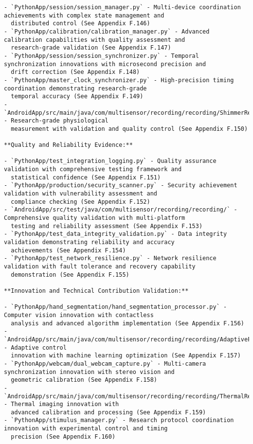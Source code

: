 \documentclass[11pt,a4paper]{report}
\begin{document}
\begin{verbatim}
- `PythonApp/session/session_manager.py` - Multi-device coordination achievements with complex state management and
  distributed control (See Appendix F.146)
- `PythonApp/calibration/calibration_manager.py` - Advanced calibration capabilities with quality assessment and
  research-grade validation (See Appendix F.147)
- `PythonApp/session/session_synchronizer.py` - Temporal synchronization innovations with microsecond precision and
  drift correction (See Appendix F.148)
- `PythonApp/master_clock_synchronizer.py` - High-precision timing coordination demonstrating research-grade
  temporal accuracy (See Appendix F.149)
- `AndroidApp/src/main/java/com/multisensor/recording/recording/ShimmerRecorder.kt` - Research-grade physiological
  measurement with validation and quality control (See Appendix F.150)

**Quality and Reliability Evidence:**

- `PythonApp/test_integration_logging.py` - Quality assurance validation with comprehensive testing framework and
  statistical confidence (See Appendix F.151)
- `PythonApp/production/security_scanner.py` - Security achievement validation with vulnerability assessment and
  compliance checking (See Appendix F.152)
- `AndroidApp/src/test/java/com/multisensor/recording/recording/` - Comprehensive quality validation with multi-platform
  testing and reliability assessment (See Appendix F.153)
- `PythonApp/test_data_integrity_validation.py` - Data integrity validation demonstrating reliability and accuracy
  achievements (See Appendix F.154)
- `PythonApp/test_network_resilience.py` - Network resilience validation with fault tolerance and recovery capability
  demonstration (See Appendix F.155)

**Innovation and Technical Contribution Validation:**

- `PythonApp/hand_segmentation/hand_segmentation_processor.py` - Computer vision innovation with contactless
  analysis and advanced algorithm implementation (See Appendix F.156)
- `AndroidApp/src/main/java/com/multisensor/recording/recording/AdaptiveFrameRateController.kt` - Adaptive control
  innovation with machine learning optimization (See Appendix F.157)
- `PythonApp/webcam/dual_webcam_capture.py` - Multi-camera synchronization innovation with stereo vision and
  geometric calibration (See Appendix F.158)
- `AndroidApp/src/main/java/com/multisensor/recording/recording/ThermalRecorder.kt` - Thermal imaging innovation with
  advanced calibration and processing (See Appendix F.159)
- `PythonApp/stimulus_manager.py` - Research protocol coordination innovation with experimental control and timing
  precision (See Appendix F.160)


\end{verbatim}
\end{document}
